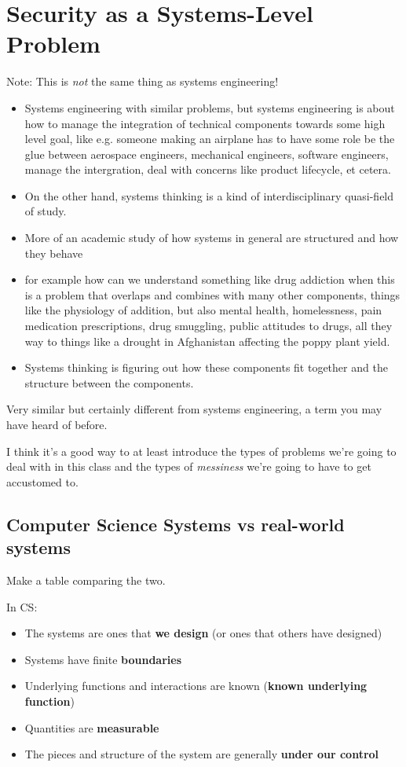 \documentclass[11pt]{article}
\begin{document}
\section{Security as a Systems-Level Problem}

Note: This is {\it not} the same thing as systems engineering! 
\begin{itemize}
    \item Systems engineering with similar problems, but systems engineering is about how to manage the integration of technical components towards some high level goal, like e.g. someone making an airplane has to have some role be the glue between aerospace engineers, mechanical engineers, software engineers, manage the intergration, deal with concerns like product lifecycle, et cetera. 
    \item On the other hand, systems thinking is a kind of interdisciplinary quasi-field of study.
    \item More of an academic study of how systems in general are structured and how they behave
    \item for example how can we understand something like drug addiction when this is a problem that overlaps and combines with many other components, things like the physiology of addition, but also mental health, homelessness, pain medication prescriptions, drug smuggling, public attitudes to drugs, all they way to things like a drought in Afghanistan affecting the poppy plant yield.
    \item Systems thinking is figuring out how these components fit together and the structure between the components.
\end{itemize}

Very similar but certainly different from systems engineering, a term you may have heard of before. 

I think it's a good way to at least introduce the types of problems we're going to deal with in this class and the types of {\it messiness} we're going to have to get accustomed to. 

\subsection{Computer Science Systems vs real-world systems}

Make a table comparing the two.

In CS:
\begin{itemize}
    \item The systems are ones that {\bf we design} (or ones that others have designed)
    \item Systems have finite {\bf boundaries}
    \item Underlying functions and interactions are known ({\bf known underlying function})
    \item Quantities are {\bf measurable}
    \item The pieces and structure of the system are generally {\bf under our control} 
\end{itemize}
\end{document}
